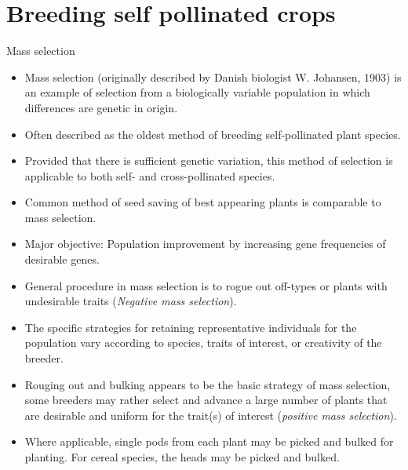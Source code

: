 \documentclass[11pt,ignorenonframetext,aspectratio=169]{beamer}
\providecommand{\tightlist}{%
  \setlength{\itemsep}{0pt}\setlength{\parskip}{0pt}}
\begin{document}
\hypertarget{breeding-self-pollinated-crops}{%
\section{Breeding self pollinated
crops}\label{breeding-self-pollinated-crops}}

\begin{frame}{Mass selection}
\protect\hypertarget{mass-selection}{}
\begin{itemize}
\tightlist
\item
  Mass selection (originally described by Danish biologist W. Johansen,
  1903) is an example of selection from a biologically variable
  population in which differences are genetic in origin.
\item
  Often described as the oldest method of breeding self-pollinated plant
  species.
\item
  Provided that there is sufficient genetic variation, this method of
  selection is applicable to both self- and cross-pollinated species.
\item
  Common method of seed saving of best appearing plants is comparable to
  mass selection.
\item
  Major objective: Population improvement by increasing gene frequencies
  of desirable genes.
\end{itemize}
\end{frame}

\begin{frame}{}
\protect\hypertarget{section-1}{}
\begin{itemize}
\tightlist
\item
  General procedure in mass selection is to rogue out off-types or
  plants with undesirable traits (\emph{Negative mass selection}).
\item
  The specific strategies for retaining representative individuals for
  the population vary according to species, traits of interest, or
  creativity of the breeder.
\item
  Rouging out and bulking appears to be the basic strategy of mass
  selection, some breeders may rather select and advance a large number
  of plants that are desirable and uniform for the trait(s) of interest
  (\emph{positive mass selection}).
\item
  Where applicable, single pods from each plant may be picked and bulked
  for planting. For cereal species, the heads may be picked and bulked.
\end{itemize}
\end{frame}
\end{document}
